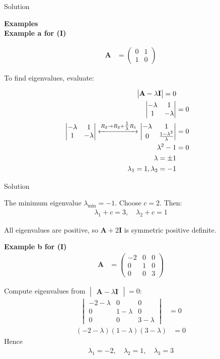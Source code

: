 \documentclass{beamer}
\numberwithin{equation}{section}
\theoremstyle{remark}
\newcommand{\myvec}[1]{\ensuremath{\begin{pmatrix}#1\end{pmatrix}}}
\newcommand{\mydet}[1]{\ensuremath{\begin{vmatrix}#1\end{vmatrix}}}
\let\vec\mathbf
\begin{document}
\begin{frame}{Solution}

\textbf{Examples}\\

\textbf{Example a for (I)}

\begin{align}
\vec{A} &= \myvec{0 & 1\\ 1 & 0}
\end{align}

To find eigenvalues, evaluate:

\begin{align}
\mydet{\vec{A}-\lambda \vec{I}}=0\\
\mydet{-\lambda & 1\\1 & -\lambda} &= 0\\
\mydet{-\lambda & 1\\1 & -\lambda} 
\xleftrightarrow{R_2 \to R_2 + \tfrac{1}{\lambda}R_1}
\mydet{-\lambda & 1\\0 & \tfrac{1-\lambda^2}{\lambda}} &= 0\\
\lambda^2 - 1 &= 0\\
\lambda = \pm1\\
\lambda_1=1, \lambda_2=-1
\end{align}

\end{frame}

\begin{frame}{Solution}

The minimum eigenvalue $\lambda_{\min}=-1$. Choose $c=2$. Then:
\begin{align}
\lambda_1+c=3,\quad \lambda_2+c=1
\end{align}

All eigenvalues are positive, so $\vec{A}+2\vec{I}$ is symmetric positive definite.

\textbf{Example b for (I)}
\begin{align}
\vec{A} &= \myvec{-2 & 0 & 0\\ 0 & 1 & 0\\ 0 & 0 & 3}
\end{align}

Compute eigenvalues from $\mydet{\vec{A}-\lambda\vec{I}}=0$:
\begin{align}
\mydet{-2-\lambda & 0 & 0\\0 & 1-\lambda & 0\\0 & 0 & 3-\lambda} &= 0
\end{align}
\begin{align}
(-2-\lambda)(1-\lambda)(3-\lambda)&=0
\end{align}
Hence
\begin{align}
\lambda_1=-2,\quad \lambda_2=1,\quad \lambda_3=3
\end{align}

\end{frame}
\end{document}
